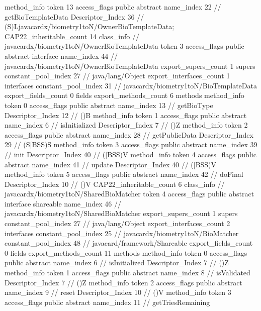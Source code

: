 {{{{{				}
				method_info {
					token	13
					access_flags	public abstract
					name_index	22		// getBioTemplateData
					Descriptor_Index	36		// (S)Ljavacardx/biometry1toN/OwnerBioTemplateData;
				}
			}
			CAP22_inheritable_count	14
		}
		class_info {		// javacardx/biometry1toN/OwnerBioTemplateData
			token	3
			access_flags	public abstract interface
			name_index	44		// javacardx/biometry1toN/OwnerBioTemplateData
			export_supers_count	1
			supers {
				constant_pool_index	27		// java/lang/Object
			}
			export_interfaces_count	1
			interfaces {
				constant_pool_index	31		// javacardx/biometry1toN/BioTemplateData
			}
			export_fields_count	0
			fields {
			}
			export_methods_count	6
			methods {
				method_info {
					token	0
					access_flags	public abstract
					name_index	13		// getBioType
					Descriptor_Index	12		// ()B
				}
				method_info {
					token	1
					access_flags	public abstract
					name_index	6		// isInitialized
					Descriptor_Index	7		// ()Z
				}
				method_info {
					token	2
					access_flags	public abstract
					name_index	28		// getPublicData
					Descriptor_Index	29		// (S[BSS)S
				}
				method_info {
					token	3
					access_flags	public abstract
					name_index	39		// init
					Descriptor_Index	40		// ([BSS)V
				}
				method_info {
					token	4
					access_flags	public abstract
					name_index	41		// update
					Descriptor_Index	40		// ([BSS)V
				}
				method_info {
					token	5
					access_flags	public abstract
					name_index	42		// doFinal
					Descriptor_Index	10		// ()V
				}
			}
			CAP22_inheritable_count	6
		}
		class_info {		// javacardx/biometry1toN/SharedBioMatcher
			token	4
			access_flags	public abstract interface shareable
			name_index	46		// javacardx/biometry1toN/SharedBioMatcher
			export_supers_count	1
			supers {
				constant_pool_index	27		// java/lang/Object
			}
			export_interfaces_count	2
			interfaces {
				constant_pool_index	25		// javacardx/biometry1toN/BioMatcher
				constant_pool_index	48		// javacard/framework/Shareable
			}
			export_fields_count	0
			fields {
			}
			export_methods_count	11
			methods {
				method_info {
					token	0
					access_flags	public abstract
					name_index	6		// isInitialized
					Descriptor_Index	7		// ()Z
				}
				method_info {
					token	1
					access_flags	public abstract
					name_index	8		// isValidated
					Descriptor_Index	7		// ()Z
				}
				method_info {
					token	2
					access_flags	public abstract
					name_index	9		// reset
					Descriptor_Index	10		// ()V
				}
				method_info {
					token	3
					access_flags	public abstract
					name_index	11		// getTriesRemaining
}}}}}
